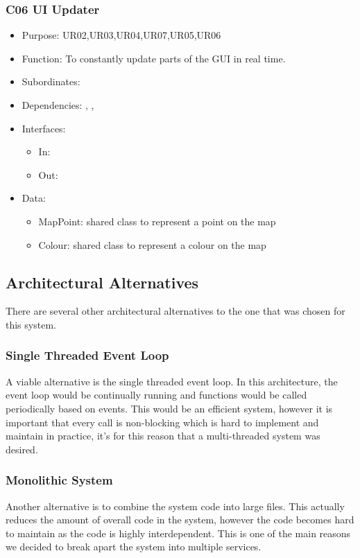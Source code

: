 \subsubsection{C06 UI Updater} \label{compUIUpdater}
\begin{itemize}
	\item Purpose: UR02,UR03,UR04,UR07,UR05,UR06
	\item Function: To constantly update parts of the GUI in real time. 
	\item Subordinates:
	\item Dependencies: , , 
	\item Interfaces:
	\begin{itemize}
		\item In: \texttt{}
		\item Out: \texttt{}
	\end{itemize}
	\item Data:
	\begin{itemize}
		\item MapPoint: shared class to represent a point on the map
		\item Colour: shared class to represent a colour on the map
	\end{itemize}
\end{itemize}

\subsection{Architectural Alternatives}
There are several other architectural alternatives to the one that was chosen for this system. 

\subsubsection*{Single Threaded Event Loop}
A viable alternative is the single threaded event loop. In this architecture, the event loop would be continually running and functions would be called periodically based on events. This would be an efficient system, however it is important that every call is non-blocking which is hard to implement and maintain in practice, it's for this reason that a multi-threaded system was desired.

\subsubsection*{Monolithic System}
Another alternative is to combine the system code into large files. This actually reduces the amount of overall code in the system, however the code becomes hard to maintain as the code is highly interdependent. This is one of the main reasons we decided to break apart the system into multiple services.

